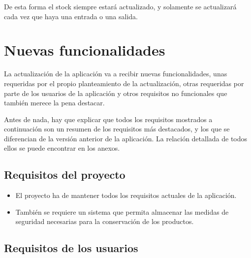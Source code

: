De esta forma el stock siempre estará actualizado, y solamente se actualizará cada vez que haya una entrada o una salida. 


\section{Nuevas funcionalidades}

La actualización de la aplicación va a recibir nuevas funcionalidades, unas requeridas por el propio planteamiento de la actualización, otras requeridas por parte de los usuarios de la aplicación y otros requisitos no funcionales que también merece la pena destacar. 

Antes de nada, hay que explicar que todos los requisitos mostrados a continuación son un resumen de los requisitos más destacados, y los que se diferencian de la versión anterior de la aplicación. La relación detallada de todos ellos se puede encontrar en los anexos.

\subsection{Requisitos del proyecto}

\begin{itemize}
\item El proyecto ha de mantener todos los requisitos actuales de la aplicación.

\item También se requiere un sistema que permita almacenar las medidas de seguridad necesarias para la conservación de los productos.

\end{itemize}

\subsection{Requisitos de los usuarios}

